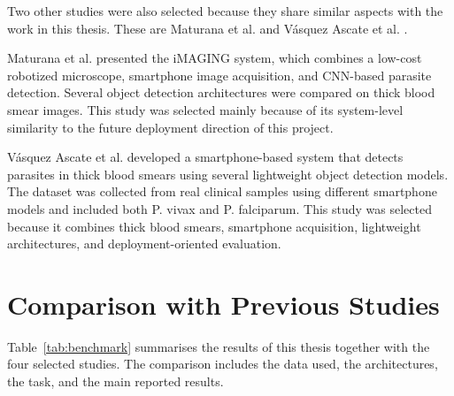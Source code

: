 Two other studies were also selected because they share similar aspects with the work in this thesis. These are Maturana et al. \cite{Maturana2023} and Vásquez Ascate et al. \cite{VasquezAscate2026}.

Maturana et al. \cite{Maturana2023} presented the iMAGING system, which combines a low-cost robotized microscope, smartphone image acquisition, and CNN-based parasite detection. Several object detection architectures were compared on thick blood smear images. This study was selected mainly because of its system-level similarity to the future deployment direction of this project.

Vásquez Ascate et al. \cite{VasquezAscate2026} developed a smartphone-based system that detects parasites in thick blood smears using several lightweight object detection models. The dataset was collected from real clinical samples using different smartphone models and included both P. vivax and P. falciparum. This study was selected because it combines thick blood smears, smartphone acquisition, lightweight architectures, and deployment-oriented evaluation.

\section{Comparison with Previous Studies}

Table~\ref{tab:benchmark} summarises the results of this thesis together with the four selected studies. The comparison includes the data used, the architectures, the task, and the main reported results.

